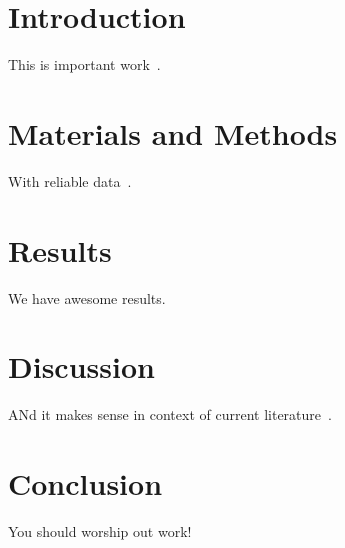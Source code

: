 \documentclass[12pt,a4paper,oneside,final]{book}
\begin{document}

\VytvorObsah
\cleardoublepage

\setcounter{page}{1}
\pagestyle{plain}
\renewcommand{\chaptermark}[1]{\markboth{\thechapter. #1}{}}
\renewcommand{\sectionmark}[1]{\markright{\thesection. #1}{}}

\HlavickaKapitoly

\chapter{Introduction} \label{intro}

This is important work~\cite{jaron2013}.

\chapter{Materials and Methods} \label{methods}

With reliable data~\cite{uniprot_yeast2013}.

\chapter{Results} \label{results}

We have awesome results.

\chapter{Discussion} \label{discussion}

ANd it makes sense in context of current literature~\cite{uchiyama2006}.

\chapter{Conclusion} \label{conclusion}

You should worship out work!

\clearpage

{}

\renewcommand{\bibname}{References}

\HlavickaLiteratura

\clearpage

%
%

\end{document}
